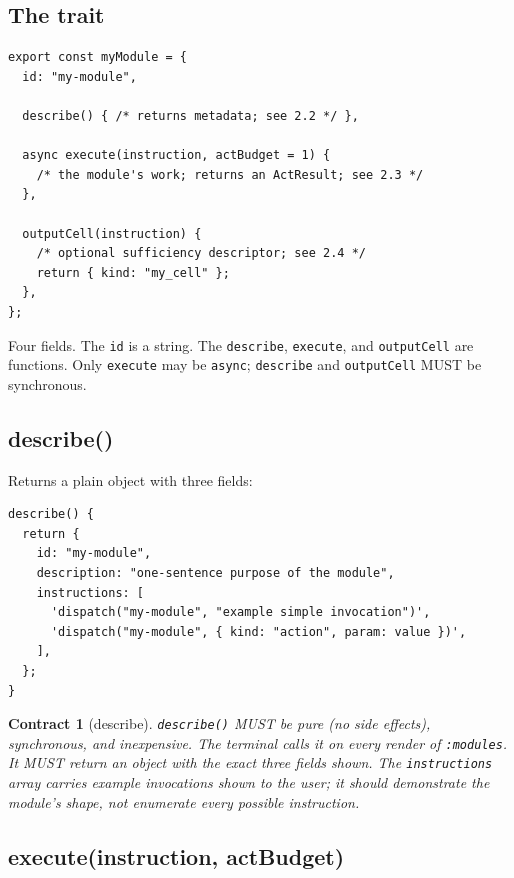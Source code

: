 \documentclass[11pt,a4paper]{article}
\theoremstyle{contract}
\newtheorem{contract}{Contract}[section]
\begin{document}
\subsection{The trait}

\begin{lstlisting}
export const myModule = {
  id: "my-module",

  describe() { /* returns metadata; see 2.2 */ },

  async execute(instruction, actBudget = 1) {
    /* the module's work; returns an ActResult; see 2.3 */
  },

  outputCell(instruction) {
    /* optional sufficiency descriptor; see 2.4 */
    return { kind: "my_cell" };
  },
};
\end{lstlisting}

Four fields. The \texttt{id} is a string. The \texttt{describe},
\texttt{execute}, and \texttt{outputCell} are functions. Only
\texttt{execute} may be \texttt{async}; \texttt{describe} and
\texttt{outputCell} MUST be synchronous.

\subsection{describe()}

Returns a plain object with three fields:

\begin{lstlisting}
describe() {
  return {
    id: "my-module",
    description: "one-sentence purpose of the module",
    instructions: [
      'dispatch("my-module", "example simple invocation")',
      'dispatch("my-module", { kind: "action", param: value })',
    ],
  };
}
\end{lstlisting}

\begin{contract}[describe]
\label{contract:describe}
\texttt{describe()} MUST be pure (no side effects), synchronous, and
inexpensive. The terminal calls it on every render of \texttt{:modules}.
It MUST return an object with the exact three fields shown. The
\texttt{instructions} array carries example invocations shown to the
user; it should demonstrate the module's shape, not enumerate every
possible instruction.
\end{contract}

\subsection{execute(instruction, actBudget)}
\end{document}
